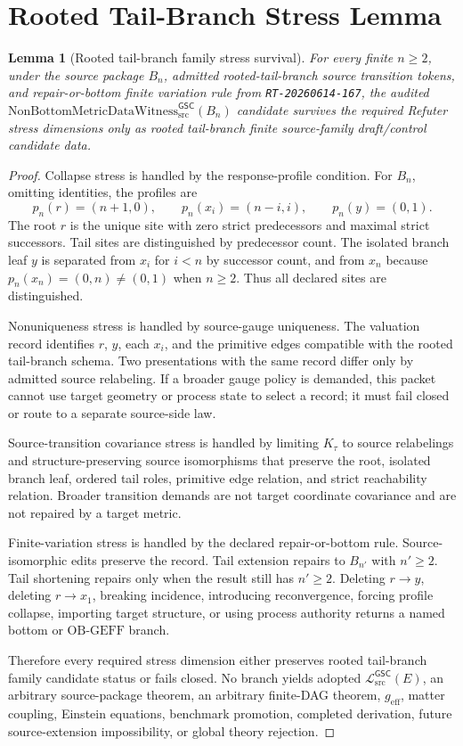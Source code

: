 \documentclass[11pt]{article}
\newcommand{\Witness}{\mathrm{NonBottomMetricDataWitness}_{\mathrm{src}}^{\mathsf{GSC}}}
\newcommand{\MetricData}{\mathcal{L}_{\mathrm{src}}^{\mathsf{GSC}}}
\newcommand{\OBGEFF}{\mathrm{OB\mbox{-}GEFF}}
\newcommand{\geff}{g_{\mathrm{eff}}}
\newcommand{\Bn}{B_n}
\newcommand{\Bnprime}{B_{n'}}
\newtheorem{lemma}{Lemma}
\begin{document}
\section{Rooted Tail-Branch Stress Lemma}

\begin{lemma}[Rooted tail-branch family stress survival]
For every finite \(n\ge 2\), under the source package \(\Bn\), admitted
rooted-tail-branch source transition tokens, and repair-or-bottom finite
variation rule from \texttt{RT-20260614-167}, the audited
\(\Witness(\Bn)\) candidate survives the required Refuter stress dimensions
only as rooted tail-branch finite source-family draft/control candidate data.
\end{lemma}

\begin{proof}
Collapse stress is handled by the response-profile condition. For \(\Bn\),
omitting identities, the profiles are
\[
p_n(r)=(n+1,0),\qquad
p_n(x_i)=(n-i,i),\qquad
p_n(y)=(0,1).
\]
The root \(r\) is the unique site with zero strict predecessors and maximal
strict successors. Tail sites are distinguished by predecessor count. The
isolated branch leaf \(y\) is separated from \(x_i\) for \(i<n\) by successor
count, and from \(x_n\) because \(p_n(x_n)=(0,n)\ne(0,1)\) when \(n\ge 2\).
Thus all declared sites are distinguished.

Nonuniqueness stress is handled by source-gauge uniqueness. The valuation
record identifies \(r\), \(y\), each \(x_i\), and the primitive edges
compatible with the rooted tail-branch schema. Two presentations with the
same record differ only by admitted source relabeling. If a broader gauge
policy is demanded, this packet cannot use target geometry or process state
to select a record; it must fail closed or route to a separate source-side
law.

Source-transition covariance stress is handled by limiting \(K_{\tau}\) to
source relabelings and structure-preserving source isomorphisms that preserve
the root, isolated branch leaf, ordered tail roles, primitive edge relation,
and strict reachability relation. Broader transition demands are not target
coordinate covariance and are not repaired by a target metric.

Finite-variation stress is handled by the declared repair-or-bottom rule.
Source-isomorphic edits preserve the record. Tail extension repairs to
\(\Bnprime\) with \(n'\ge 2\). Tail shortening repairs only when the result
still has \(n'\ge 2\). Deleting \(r\to y\), deleting \(r\to x_1\), breaking
incidence, introducing reconvergence, forcing profile collapse, importing
target structure, or using process authority returns a named bottom or
\(\OBGEFF\) branch.

Therefore every required stress dimension either preserves rooted
tail-branch family candidate status or fails closed. No branch yields adopted
\(\MetricData(E)\), an arbitrary source-package theorem, an arbitrary
finite-DAG theorem, \(\geff\), matter coupling, Einstein equations,
benchmark promotion, completed derivation, future source-extension
impossibility, or global theory rejection.
\end{proof}
\end{document}
